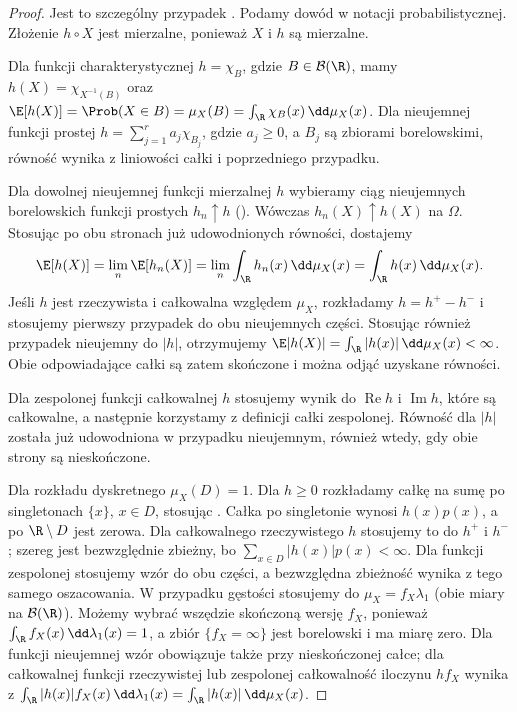 \begin{proof}
Jest to szczególny przypadek
.
Podamy dowód w notacji probabilistycznej. Złożenie $h\circ X$
jest mierzalne, ponieważ $X$ i $h$ są mierzalne.

Dla funkcji charakterystycznej $h=\chi_B$, gdzie
$B\in\mathcal B(\R)$, mamy $h(X)=\chi_{X^{-1}(B)}$ oraz
$\E[h(X)]=\Prob(X\in B)=\mu_X(B)
=\int_\R\chi_B(x)\,\dd\mu_X(x)$.
Dla nieujemnej funkcji prostej
$h=\sum_{j=1}^r a_j\chi_{B_j}$, gdzie $a_j\geq0$,
a $B_j$ są zbiorami borelowskimi,
równość wynika z liniowości całki i poprzedniego przypadku.

Dla dowolnej nieujemnej funkcji mierzalnej $h$
wybieramy ciąg nieujemnych borelowskich funkcji prostych
$h_n\uparrow h$
().
Wówczas $h_n(X)\uparrow h(X)$ na $\Omega$.
Stosując 
po obu stronach już udowodnionych równości, dostajemy
\[
\E[h(X)]=\lim_n\E[h_n(X)]
=\lim_n\int_\R h_n(x)\,\dd\mu_X(x)
=\int_\R h(x)\,\dd\mu_X(x).
\]
Jeśli $h$ jest rzeczywista i całkowalna względem $\mu_X$,
rozkładamy $h=h^+-h^-$ i stosujemy pierwszy przypadek
do obu nieujemnych części. Stosując również przypadek
nieujemny do $|h|$, otrzymujemy
$\E|h(X)|=\int_\R|h(x)|\,\dd\mu_X(x)<\infty$.
Obie odpowiadające całki są zatem skończone i można
odjąć uzyskane równości.

Dla zespolonej funkcji całkowalnej $h$ stosujemy wynik
do $\operatorname{Re}h$ i $\operatorname{Im}h$, które są
całkowalne, a następnie korzystamy z definicji całki zespolonej.
Równość dla $|h|$ została już udowodniona w przypadku
nieujemnym, również wtedy, gdy obie strony są nieskończone.

Dla rozkładu dyskretnego $\mu_X(D)=1$. Dla $h\geq0$
rozkładamy całkę na sumę po singletonach $\{x\}$,
$x\in D$, stosując
.
Całka po singletonie wynosi $h(x)p(x)$, a po
$\R\setminus D$ jest zerowa. Dla całkowalnego rzeczywistego $h$
stosujemy to do $h^+$ i $h^-$; szereg jest bezwzględnie
zbieżny, bo $\sum_{x\in D}|h(x)|p(x)<\infty$.
Dla funkcji zespolonej stosujemy wzór do obu części,
a bezwzględna zbieżność wynika z tego samego oszacowania.
W przypadku gęstości stosujemy
do $\mu_X=f_X\lambda_1$ (obie miary na $\mathcal B(\R)$).
Możemy wybrać wszędzie skończoną wersję $f_X$, ponieważ
$\int_\R f_X(x)\,\dd\lambda_1(x)=1$, a zbiór
$\{f_X=\infty\}$ jest borelowski i ma miarę zero.
Dla funkcji nieujemnej wzór obowiązuje także przy
nieskończonej całce; dla całkowalnej funkcji rzeczywistej
lub zespolonej całkowalność iloczynu $hf_X$ wynika z
$\int_\R |h(x)|f_X(x)\,\dd\lambda_1(x)=\int_\R |h(x)|\,\dd\mu_X(x)$.
\end{proof}


